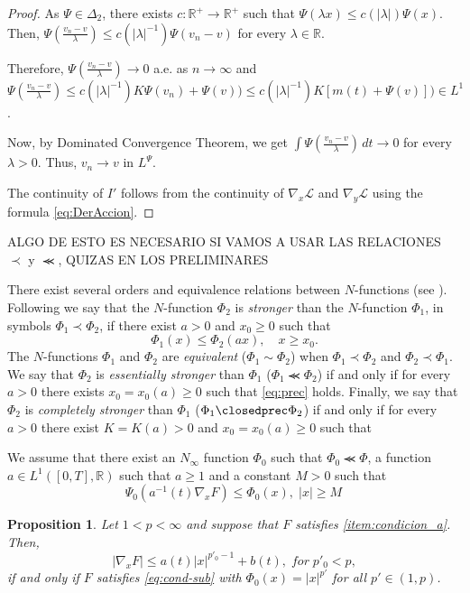 \documentclass[twoside]{article}
\newtheorem{prop}[thm]{Proposition}
\theoremstyle{remark}
\newcommand{\rr}{\mathbb{R}}
\renewcommand{\leq}{\leqslant}
\renewcommand{\geq}{\geqslant}
\begin{document}
\begin{proof}
As  $\Psi\in\Delta_2$, there exists $c:\rr^+\to \rr^+$ such that 
$\Psi(\lambda x)\leq c(|\lambda|)\Psi(x)$. 
Then, $\Psi(\frac{v_n-v}{\lambda})\leq c(|\lambda|^{-1})\Psi(v_n-v)$ for every $\lambda \in \rr$.

Therefore, $\Psi(\frac{v_n-v}{\lambda})\to 0$ a.e. as $n \to \infty$ and 
$\Psi(\frac{v_n-v}{\lambda})\leq c(|\lambda|^{-1})K\Psi(v_n)+\Psi(v))
\leq c(|\lambda|^{-1}) K [m(t)+\Psi(v)])\in L^1$.

Now, by Dominated Convergence Theorem, we get
$
\int \Psi(\frac{v_n-v}{\lambda})\,dt \to 0
$
for every $\lambda>0$. Thus, $v_n \to v$ in $L^{\Psi}$.

The continuity of $I'$  follows  from the continuity 
of $\nabla_x\mathcal{L}$ and $\nabla_y\mathcal{L}$ using the formula \eqref{eq:DerAccion}.
\end{proof}




ALGO DE ESTO ES NECESARIO SI VAMOS A USAR LAS RELACIONES $\prec$ y $\llcurly$, QUIZAS EN LOS PRELIMINARES

There exist several orders and equivalence relations between $N$-functions (see \cite[Sec. 2.2]{rao1991theory}).
Following \cite[Def. 1, pp. 15-16]{rao1991theory} we say that the   $N$-function $\Phi_2$ is \emph{stronger} than the $N$-function  $\Phi_1$, in symbols  $\Phi_1\prec\Phi_2$, if  there exist $a>0$ and $x_0\geq 0$ such that
\begin{equation}\label{eq:prec}\Phi_1(x)\leq \Phi_2(ax), \quad x\geq x_0.\end{equation}
 The $N$-functions  $\Phi_1$ and   $\Phi_2$ are \emph{equivalent} ($\Phi_1\sim\Phi_2$)  when  $\Phi_1\prec\Phi_2$ and $\Phi_2\prec\Phi_1$.
We say that  $\Phi_2$ is \emph{essentially stronger} than  $\Phi_1$  ($\Phi_1\llcurly\Phi_2$) if and only if for every $a>0$ there exists $x_0=x_0(a)\geq 0$ such that \eqref{eq:prec} holds. Finally, we say that  $\Phi_2$ is \emph{completely stronger} than  $\Phi_1$  ($\Phi_1\closedprec\Phi_2$) if and only if for every $a>0$ there exist $K=K(a)>0$ and  $x_0=x_0(a)\geq 0$ such that


We assume that there exist an $N_\infty$ function $\Phi_0$ such that $\Phi_0 \llcurly \Phi$, 
a function $a \in  L^1([0,T],\rr)$ such that $a\geq 1$ and a constant $M>0$ such that 
\begin{equation}\label{eq:cond-sub}
\Psi_0(a^{-1}(t)\nabla_x F)\leq \Phi_0(x),\;|x|\geq M\,\tag{Sub}
\end{equation}

\begin{prop}
Let $1<p<\infty$ and suppose that $F$ satisfies  \ref{item:condicion_a}. Then, 
\begin{equation}\label{eq:cond-sub-p}
|\nabla_x F|\leq a(t)|x|^{p'_0-1}+b(t),\;for\; p'_0<p,
\end{equation}
 if and only if
$F$ satisfies \eqref{eq:cond-sub} with $\Phi_0(x)=|x|^{p'}$ for all $p'\in(1,p)$.
\end{prop}
\end{document}

